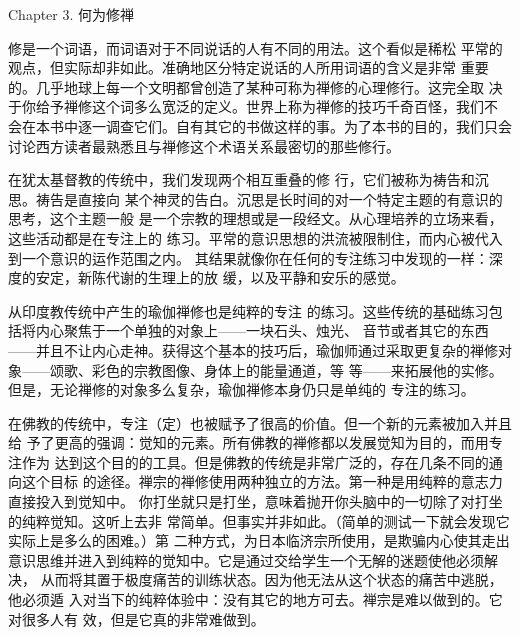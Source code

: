 


\beginchapter Chapter 3. 何为修禅


{
\parindent=3pc
\noindent\hang{}
\1%
{修是一个词语}，而词语对于不同说话的人有不同的用法。这个看似是稀松
平常的观点，但实际却非如此。准确地区分特定说话的人所用词语的含义是非常
重要的。几乎地球上每一个文明都曾创造了某种可称为禅修的心理修行。这完全取
决于你给予禅修这个词多么宽泛的定义。世界上称为禅修的技巧千奇百怪，我们不
会在本书中逐一调查它们。自有其它的书做这样的事。为了本书的目的，我们只会
讨论西方读者最熟悉且与禅修这个术语关系最密切的那些修行。

}

在犹太基督教的传统中，我们发现两个相互重叠的修
行，它们被称为祷告和沉思。祷告是直接向
某个神灵的告白。沉思是长时间的对一个特定主题的有意识的思考，这个主题一般
是一个宗教的理想或是一段经文。从心理培养的立场来看，这些活动都是在专注上的
练习。平常的意识思想的洪流被限制住，而内心被代入到一个意识的运作范围之内。
其结果就像你在任何的专注练习中发现的一样：深度的安定，新陈代谢的生理上的放
缓，以及平静和安乐的感觉。

从印度教传统中产生的瑜伽禅修也是\1纯粹的专注
的练习。这些传统的基础练习包括将内心聚焦于一个单独的对象上——一块石头、烛光、
音节或者其它的东西——并且不让内心走神。获得这个基本的技巧后，瑜伽师通过采取更复杂的禅修对象——颂歌、彩色的宗教图像、身体上的能量通道，等
等——来拓展他的实修。但是，无论禅修的对象多么复杂，瑜伽禅修本身仍只是单纯的
专注的练习。

在佛教的传统中，专注（定）也被赋予了很高的价值。但一个新的元素被加入并且给
予了更高的强调：觉知的元素。所有佛教的禅修都以发展觉知为目的，而用专注作为
达到这个目的的工具。但是佛教的传统是非常广泛的，存在几条不同的通向这个目标
的途径。禅宗的禅修使用两种独立的方法。第一种是用纯粹的意志力直接投入到觉知中。
你打坐就只是打坐，意味着抛开你头脑中的一切除了对打坐的纯粹觉知。这听上去非
常简单。但事实并非如此。（简单的测试一下就会发现它实际上是多么的困难。）第
二种方式，为日本临济宗所使用，是欺骗内心使其走出
意识思维并进入到纯粹的觉知中。它是通过交给学生一个无解的迷题使他必须解决，
从而将其置于极度痛苦的训练状态。因为他无法从这个状态的痛苦中逃脱，他必须遁
入对当下的纯粹体验中：没有其它的地方可去。禅宗是难以做到的。它对很多人有
效，但是它真的非常难做到。

